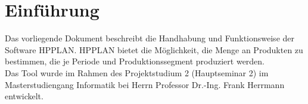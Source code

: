 \documentclass[12pt,a4paper, listof=entryprefix, bibliography=totocnumbered,toc=listofnumbered,lof=listofnumbered]{scrartcl}
\newcounter{verzeichnis}
\begin{document}
\singlespacing %
\setcounter{section}{0}
\setcounter{page}{1}

\tableofcontents %
\pagebreak

\onehalfspacing %
\renewcommand{\thesection}{\arabic{section}} %
\setcounter{page}{1}	%
\setcounter{section}{0}
\renewcommand{\sectionmark}[1]{\markright{#1}} %
\renewcommand{\subsectionmark}[1]{}            %
\renewcommand{\subsubsectionmark}[1]{}         %
\rhead{\rightmark}                             %

\section{Einführung}
\label{ch:einfuehrung}
Das vorliegende Dokument beschreibt die Handhabung und Funktionsweise der Software \gls{HPPLAN}. \gls{HPPLAN} bietet die Möglichkeit, die Menge an Produkten zu bestimmen, die je Periode und Produktionssegment produziert werden. \\
Das Tool wurde im Rahmen des Projektstudium 2 (Hauptseminar 2) im Masterstudiengang Informatik bei Herrn Professor Dr.-Ing. Frank Herrmann entwickelt. 



\pagebreak

\end{document}
